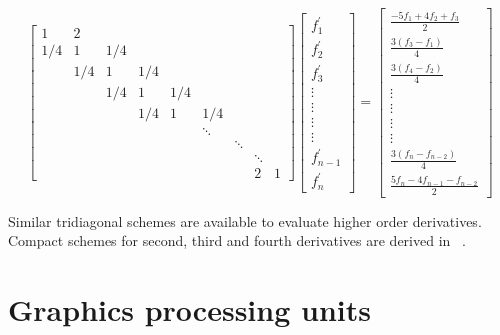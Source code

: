 \begin{equation}
 \label{eqn:compact-tridiagonal-system}
 \begin{bmatrix}
     1&2\\
     1/4&1&1/4\\
     &1/4&1&1/4\\
     &&1/4&1&1/4\\
     &&&1/4&1&1/4\\
     &&&&&\ddots\\
     &&&&&&\ddots\\
     &&&&&&&\ddots\\
     &&&&&&&2&1
  \end{bmatrix}
  \begin{bmatrix}
      f^{\prime}_1 \\

      f^{\prime}_2 \\
      f^{\prime}_3 \\
      \vdots \\
      \vdots \\
      \vdots \\
      \vdots \\
      f^{\prime}_{n-1} \\
      f^{\prime}_n
   \end{bmatrix}
 =
 \begin{bmatrix}
     \frac{-5f_1 + 4f_2 + f_3}{2}\\
     \frac{3(f_{3} - f_{1})}{4}\\
     \frac{3(f_{4} - f_{2})}{4}\\
     \vdots\\
     \vdots\\
     \vdots\\
     \vdots\\
     \frac{3(f_{n} - f_{n-2})}{4}\\
     \frac{5f_{n} - 4f_{n-1} - f_{n-2}}{2}
  \end{bmatrix}
\end{equation}

Similar tridiagonal schemes are available
to evaluate higher order derivatives.
Compact schemes for
second, third and fourth derivatives
are derived in ~\cite{lele1992compact}.

\section{Graphics processing units}

